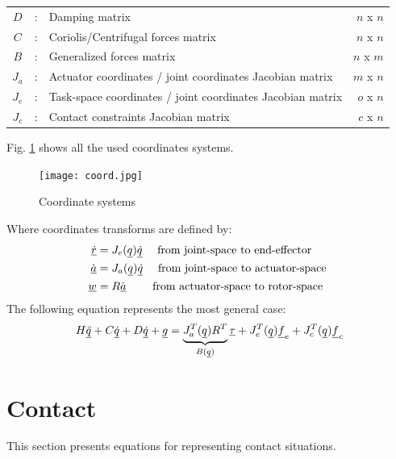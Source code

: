 {\begin{table}[htbp]
\begin{tabular}{ c c l r }
			$D$             &  :  & Damping matrix                                             & $n$ x $n$ \\
			$C$             &  :  & Coriolis/Centrifugal forces matrix                         & $n$ x $n$ \\
			$B$             &  :  & Generalized forces matrix                                  & $n$ x $m$ \\
			$J_a$           &  :  & Actuator coordinates / joint coordinates Jacobian matrix   & $m$ x $n$ \\
			$J_e$           &  :  & Task-space coordinates / joint coordinates Jacobian matrix & $o$ x $n$ \\
			$J_c$           &  :  & Contact constraints Jacobian matrix                        & $c$ x $n$  \\
		\hline \hline
        \end{tabular}		
	\label{tab:nom}
\end{table}




Fig. \ref{fig:coord} shows all the used coordinates systems. 
%
\begin{figure}[H]
	\centering
		\texttt{[image: coord.jpg]}
	\caption{Coordinate systems}%
	\label{fig:coord}
\end{figure}
%
Where coordinates transforms are defined by:
%
\begin{align}
\underline{\dot{r}}   &= J_e( \underline{q} ) \underline{\dot{q} }  \quad \text{ from joint-space to end-effector   } \\
\underline{\dot{a}}   &= J_a( \underline{q} ) \underline{\dot{q} }  \quad \text{ from joint-space to actuator-space } \\
\underline{w }        &= R              \underline{\dot{a} }  \quad\quad \text{ from actuator-space to rotor-space } 
\label{eq:coord_transform2}
\end{align}
%
%
The following equation represents the most general case:
%
\begin{align}
H \underline{\ddot{q}} + C \underline{\dot{q}} + D \underline{\dot{q}} + \underline{g} =  \underbrace{ J_a^T(\underline{q}) R^T }_{B(\underline{q})}  \underline{\tau} + J_e^T(\underline{q}) \underline{f}_e + J_c^T(\underline{q}) \underline{f}_c
\label{eq:manipulator_gen}
\end{align}


\newpage
\section{Contact}
\label{sec:contact}

This section presents equations for representing contact situations.

}
